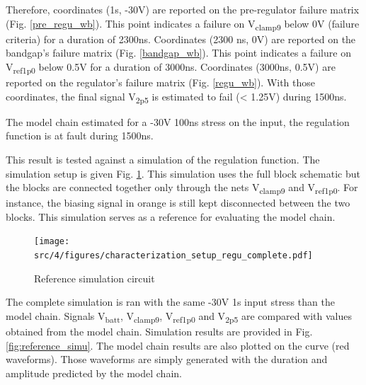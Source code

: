 Therefore, coordinates (1\textmu{}s, -30V) are reported on the pre-regulator failure matrix (Fig. \ref{pre_regu_wb}).
This point indicates a failure on V\textsubscript{clamp9} below 0V (failure criteria) for a duration of 2300ns.
Coordinates (2300 ns, 0V) are reported on the bandgap's failure matrix (Fig. \ref{bandgap_wb}).
This point indicates a failure on V\textsubscript{ref1p0} below 0.5V for a duration of 3000ns.
Coordinates (3000ns, 0.5V) are reported on the regulator's failure matrix (Fig. \ref{regu_wb}).
With those coordinates, the final signal V\textsubscript{2p5} is estimated to fail (< 1.25V) during 1500ns.

The model chain estimated for a -30V 100ns stress on the input, the regulation function is at fault during 1500ns.

This result is tested against a simulation of the regulation function.
The simulation setup is given Fig. \ref{fig:reference_simu_circuit}.
This simulation uses the full block schematic but the blocks are connected together only through the nets V\textsubscript{clamp9} and V\textsubscript{ref1p0}.
For instance, the biasing signal in orange is still kept disconnected between the two blocks.
This simulation serves as a reference for evaluating the model chain.

\begin{figure}[!h]
  \centering
  \texttt{[image: src/4/figures/characterization\_setup\_regu\_complete.pdf]}
  \caption{Reference simulation circuit}
  \label{fig:reference_simu_circuit}
\end{figure}

The complete simulation is ran with the same -30V 1\textmu{}s input stress than the model chain.
Signals V\textsubscript{batt}, V\textsubscript{clamp9}, V\textsubscript{ref1p0} and V\textsubscript{2p5} are compared with values obtained from the model chain.
Simulation results are provided in Fig. \ref{fig:reference_simu}.
The model chain results are also plotted on the curve (red waveforms).
Those waveforms are simply generated with the duration and amplitude predicted by the model chain.

